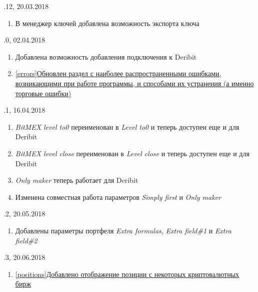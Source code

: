 \vspace{5mm}

.12, 20.03.2018
\begin{enumerate}
	\item В менеджер ключей добавлена возможность экспорта ключа
\end{enumerate}

\vspace{5mm}

.0, 02.04.2018
\begin{enumerate}
	\item Добавлена возможность добавления подключения к Deribit
	\item \hyperref[errors]{\ref{errors}Обновлен раздел с наиболее распространенными ошибками, возникающими при работе программы, и способами их устранения (а именно торговые ошибки)}
\end{enumerate}

\vspace{5mm}

.1, 16.04.2018
\begin{enumerate}
	\item \textit{BitMEX level to0} переименован в \textit{Level to0} и теперь доступен еще и для Deribit
	\item \textit{BitMEX level close} переименован в \textit{Level close} и теперь доступен еще и для Deribit
	\item \textit{Only maker} теперь работает для Deribit
	\item Изменена совместная работа параметров \textit{Simply first} и \textit{Only maker}
\end{enumerate}

\vspace{5mm}

.2, 20.05.2018
\begin{enumerate}
	\item Добавлены параметры портфеля \textit{Extra formulas}, \textit{Extra field\#1} и \textit{Extra field\#2}
\end{enumerate}

\vspace{5mm}

.3, 20.06.2018
\begin{enumerate}
	\item \hyperref[positions]{\ref{positions}Добавлено отображение позиции с некоторых криптовалютных бирж}
\end{enumerate}

